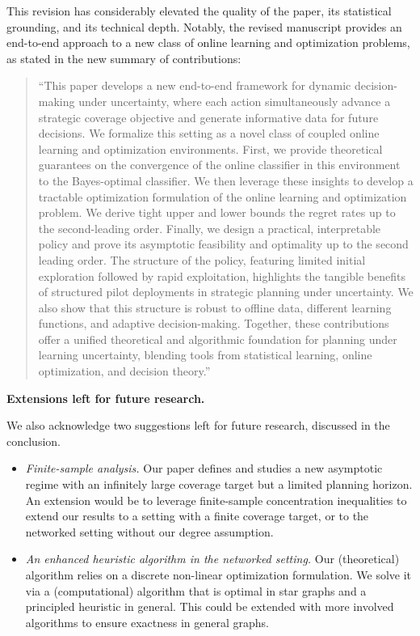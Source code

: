 \documentclass[11pt]{article}
\begin{document}
This revision has considerably elevated the quality of the paper, its statistical grounding, and its technical depth. Notably, the revised manuscript provides an end-to-end approach to a new class of online learning and optimization problems, as stated in the new summary of contributions:
\begin{quote}
    ``This paper develops a new end-to-end framework for dynamic decision-making under uncertainty, where each action simultaneously advance a strategic coverage objective and generate informative data for future decisions. We formalize this setting as a novel class of coupled online learning and optimization environments. First, we provide theoretical guarantees on the convergence of the online classifier in this environment to the Bayes-optimal classifier. We then leverage these insights to develop a tractable optimization formulation of the online learning and optimization problem. We derive tight upper and lower bounds the regret rates up to the second-leading order. Finally, we design a practical, interpretable policy and prove its asymptotic feasibility and optimality up to the second leading order. The structure of the policy, featuring limited initial exploration followed by rapid exploitation, highlights the tangible benefits of structured pilot deployments in strategic planning under uncertainty. We also show that this structure is robust to offline data, different learning functions, and adaptive decision-making. Together, these contributions offer a unified theoretical and algorithmic foundation for planning under learning uncertainty, blending tools from statistical learning, online optimization, and decision theory.''
\end{quote}

\textbf{Extensions left for future research.}

We also acknowledge two suggestions left for future research, discussed in the conclusion.

\begin{itemize}[topsep=-2pt,itemsep=-2pt]
\item[--] \emph{Finite-sample analysis.} Our paper defines and studies a new asymptotic regime with an infinitely large coverage target but a limited planning horizon. An extension would be to leverage finite-sample concentration inequalities to extend our results to a setting with a finite coverage target, or to the networked setting without our degree assumption.
\item[--] \emph{An enhanced heuristic algorithm in the networked setting.} Our (theoretical) algorithm relies on a discrete non-linear optimization formulation. We solve it via a (computational) algorithm that is optimal in star graphs and a principled heuristic in general. This could be extended with more involved algorithms to ensure exactness in general graphs.
\end{itemize}
\end{document}
